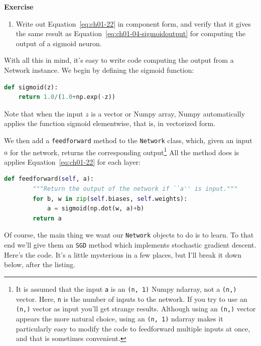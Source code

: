 \textbf{Exercise}
\begin{enumerate}
\item  Write out Equation~\ref{eq:ch01-22} in component form, and verify that it gives the same result as Equation~\ref{eq:ch01-04-sigmoidoutput} for computing the output of a sigmoid neuron.
\end{enumerate} 

With all this in mind, it's easy to write code computing the output from a Network instance. We begin by defining the sigmoid function: 
\begin{lstlisting}[language=Python]
def sigmoid(z):
    return 1.0/(1.0+np.exp(-z))
\end{lstlisting}
Note that when the input $z$ is a vector or Numpy array, Numpy automatically applies the function sigmoid elementwise, that is, in vectorized form.

We then add a \lstinline{feedforward} method to the \lstinline{Network} class, which, given an input $a$ for the network, returns the corresponding output\footnote{It is assumed that the input \lstinline{a} is an \lstinline{(n, 1)} Numpy ndarray, not a \lstinline{(n,)} vector. Here, \lstinline{n} is the number of inputs to the network. If you try to use an \lstinline{(n,)} vector as input you'll get strange results. Although using an \lstinline{(n,)} vector appears the more natural choice, using an \lstinline{(n, 1)} ndarray makes it particularly easy to modify the code to feedforward multiple inputs at once, and that is sometimes convenient. }
All the method does is applies Equation~\ref{eq:ch01-22} for each layer: 
\begin{lstlisting}[language=Python]
    def feedforward(self, a):
        """Return the output of the network if ``a'' is input."""
        for b, w in zip(self.biases, self.weights):
            a = sigmoid(np.dot(w, a)+b)
        return a
\end{lstlisting}
Of course, the main thing we want our \lstinline{Network} objects to do is to learn. To that end we'll give them an \lstinline{SGD} method which implements stochastic gradient descent. Here's the code. It's a little mysterious in a few places, but I'll break it down below, after the listing.

